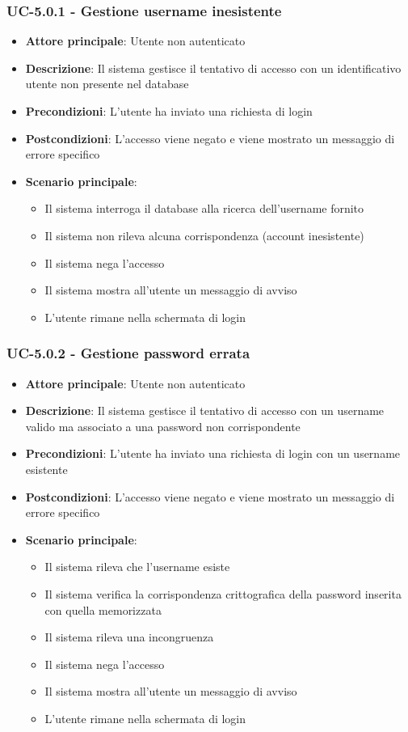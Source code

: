 \documentclass[11pt,a4paper]{article}
\begin{document}
\subsubsection{UC-5.0.1 - Gestione username inesistente}
\begin{itemize}
    \item \textbf{Attore principale}: Utente non autenticato
    \item \textbf{Descrizione}: Il sistema gestisce il tentativo di accesso con un identificativo utente non presente nel database
    \item \textbf{Precondizioni}: L’utente ha inviato una richiesta di login
    \item \textbf{Postcondizioni}: L’accesso viene negato e viene mostrato un messaggio di errore specifico
    \item \textbf{Scenario principale}:
    \begin{itemize}
        \item Il sistema interroga il database alla ricerca dell'username fornito
        \item Il sistema non rileva alcuna corrispondenza (account inesistente)
        \item Il sistema nega l'accesso
        \item Il sistema mostra all’utente un messaggio di avviso
        \item L'utente rimane nella schermata di login
    \end{itemize}
\end{itemize}

\subsubsection{UC-5.0.2 - Gestione password errata}
\begin{itemize}
    \item \textbf{Attore principale}: Utente non autenticato
    \item \textbf{Descrizione}: Il sistema gestisce il tentativo di accesso con un username valido ma associato a una password non corrispondente
    \item \textbf{Precondizioni}: L’utente ha inviato una richiesta di login con un username esistente
    \item \textbf{Postcondizioni}: L’accesso viene negato e viene mostrato un messaggio di errore specifico
    \item \textbf{Scenario principale}:
    \begin{itemize}
        \item Il sistema rileva che l'username esiste
        \item Il sistema verifica la corrispondenza crittografica della password inserita con quella memorizzata
        \item Il sistema rileva una incongruenza
        \item Il sistema nega l'accesso
        \item Il sistema mostra all’utente un messaggio di avviso
        \item L'utente rimane nella schermata di login
    \end{itemize}
\end{itemize}
\end{document}
